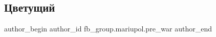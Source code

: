  
 
 
 
 

\subsection{Цветущий}
\label{sec:11_02_2023.fb.fb_group.mariupol.pre_war.9.tsvetushchii}

\ifcmt
 author_begin
   author_id fb_group.mariupol.pre_war
 author_end
\fi
